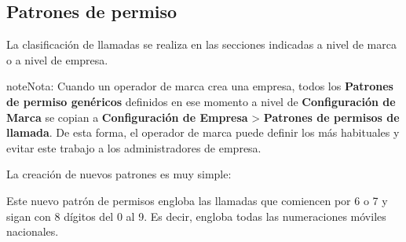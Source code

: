 \documentclass[letterpaper,10pt,spanish]{sphinxmanual}
\begin{document}
\subsection{Patrones de permiso}
\label{pbx_features/call_permissions:patrones-de-permiso}
La clasificación de llamadas se realiza en las secciones indicadas a nivel de marca o a nivel de empresa.

\begin{notice}{note}{Nota:}
Cuando un operador de marca crea una empresa, todos los \textbf{Patrones de permiso genéricos} definidos en ese momento a nivel de \textbf{Configuración de Marca} se copian a \textbf{Configuración de Empresa} \textgreater{} \textbf{Patrones de permisos de llamada}. De esta forma, el operador de marca puede definir los más habituales y evitar este trabajo a los administradores de empresa.
\end{notice}

La creación de nuevos patrones es muy simple:

\noindent{}

Este nuevo patrón de permisos engloba las llamadas que comiencen por 6 o 7 y sigan con 8 dígitos del 0 al 9. Es decir, engloba todas las numeraciones móviles nacionales.
\end{document}
